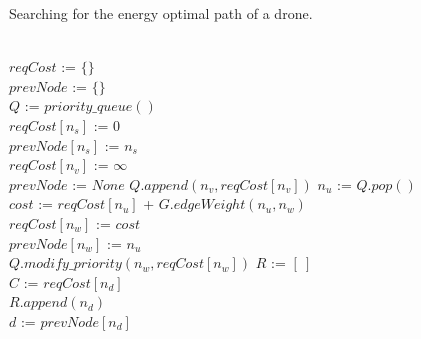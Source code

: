 \documentclass[journal]{./template/IEEEtran}
\let\oldnl\nl%
\newcommand{\nonl}{\renewcommand{\nl}{\let\nl\oldnl}}
\begin{document}
\SetNlSty{}{\color{red}}{:}
\SetAlFnt{\color{red}}
\begin{algorithm}[ht]
 \caption{Searching for the energy optimal path of a drone.}
 \KwIn{\\
 \hskip1.5em $G$ // A created graph  \\
 \hskip1.5em $n_s$ // A source node  \\
 \hskip1.5em $n_d$ // A destination node 
 }
\nonl \hrulefill \\
$reqCost$ := $\{\}$  \\
$prevNode$ := $\{\}$ \\
$Q$ := $priority\_queue()$ \\
$reqCost[n_s]$ := 0 \\
$prevNode[n_s]$ := $n_s$ \\
{
    {
        $reqCost[n_v]$ := $\infty$ \\
        $prevNode$ := $None$
    }
    $Q.append(n_v, reqCost[n_v])$
}
{
	$n_u$ := $Q.pop()$ \\
    { 
    	$cost$ := $reqCost[n_u]$ + $G.edgeWeight(n_u, n_w)$ \\
    	{
    	    $reqCost[n_w]$ := $cost$ \\
    	    $prevNode[n_w]$ := $n_u$ \\
    	    $Q.modify\_priority(n_w, reqCost[n_w])$
    	}
    }
}
$R$ := $[\ ]$ \\
$C$ := $reqCost[n_d]$ \\ 
{
    $R.append(n_d)$ \\
    $d$ := $prevNode[n_d]$
}
\end{algorithm}
\SetNlSty{}{\color{black}}{:}
\SetAlFnt{\color{black}}
\end{document}

